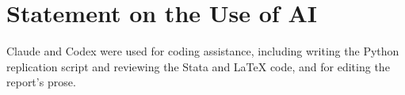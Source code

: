 \section*{Statement on the Use of AI}

Claude and Codex were used for coding assistance, including writing the
Python replication script and reviewing the Stata and LaTeX code, and for
editing the report's prose.
